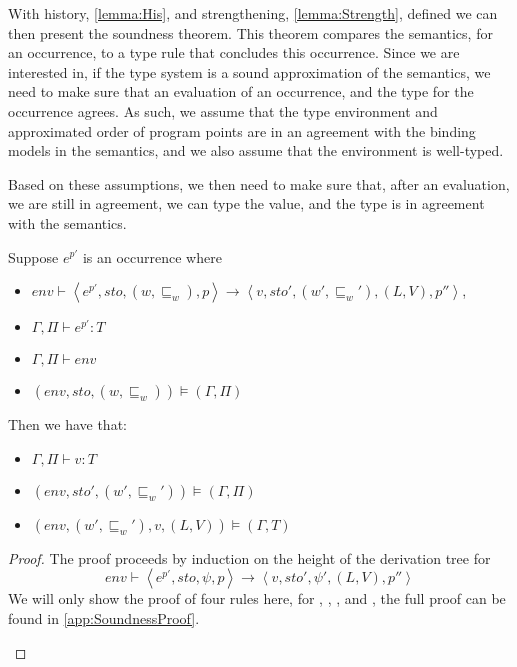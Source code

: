 \documentclass[../../master.tex]{subfiles}
\begin{document}
With history, \cref{lemma:His}, and strengthening, \cref{lemma:Strength}, defined we can then present the soundness theorem.
This theorem compares the semantics, for an occurrence, to a type rule that concludes this occurrence.
Since we are interested in, if the type system is a sound approximation of the semantics, we need to make sure that an evaluation of an occurrence, and the type for the occurrence agrees.
As such, we assume that the type environment and approximated order of program points are in an agreement with the binding models in the semantics, and we also assume that the environment is well-typed.

Based on these assumptions, we then need to make sure that, after an evaluation, we are still in agreement, we can type the value, and the type is in agreement with the semantics.

\begin{theorem}
	Suppose $e^{p'}$ is an occurrence where
	\begin{itemize}
		\item $env\vdash\left\langle e^{p'},sto,(w,\sqsubseteq_w),p\right\rangle\rightarrow\left\langle v,sto',(w',\sqsubseteq_w'),(L,V),p''\right\rangle$,
		\item $\Gamma,\Pi\vdash e^{p'} : T$
		\item $\Gamma,\Pi\vdash env$
		\item $(env,sto,(w,\sqsubseteq_w))\models(\Gamma,\Pi)$
	\end{itemize}
	Then we have that:
	\begin{itemize}
		\item $\Gamma,\Pi\vdash v:T$
		\item $(env,sto',(w',\sqsubseteq_w'))\models(\Gamma,\Pi)$
		\item $(env,(w',\sqsubseteq_w'),v,(L,V))\models(\Gamma,T)$
	\end{itemize}
\end{theorem}
\begin{proof}
	The proof proceeds by induction on the height of the derivation tree for 
	$$env\vdash\left\langle e^{p'},sto,\psi,p\right\rangle\rightarrow\left\langle v,sto',\psi',(L,V),p''\right\rangle$$
	We will only show the proof of four rules here, for , , , and , the full proof can be found in \cref{app:SoundnessProof}.

	\begin{description}
		
		
		
	\end{description}
\end{proof}

%
\end{document}
